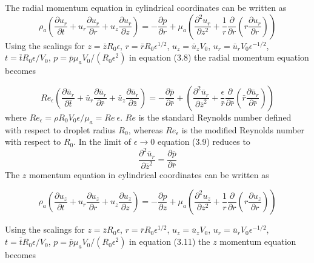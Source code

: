 \documentclass{jfm}
\begin{document}
The radial momentum equation in cylindrical coordinates can be written as
\begin{equation}
    {\rho}_a\left(\frac{{\partial}{u}_r}{{\partial}t}+{u}_r\frac{{\partial}{u}_r}{{\partial}r}+{u}_z\frac{{\partial}{u}_r}{{\partial}z}\right)=-\frac{{\partial}{p}}{{\partial}r} + {\mu}_a\left(\frac{{\partial}^2{u}_r}{{\partial}{z}^2} + \frac{1}{r}\frac{{\partial}}{{\partial}r}\left(r\frac{{\partial}{u}_r}{{\partial}r}\right)\right)
\end{equation}
Using the scalings for $z=\bar{z}R_0{\epsilon}$, ${r}=\bar{r}R_0{\epsilon}^{1/2}$, $u_z=\bar{u}_zV_0$,
$u_r=\bar{u}_rV_0{\epsilon}^{-1/2}$, $t=\bar{t}R_0{\epsilon}/V_0$, $p=\bar{p}{\mu}_aV_0/(R_0{\epsilon}^2)$ in equation (3.8) the radial momentum equation becomes

\begin{equation}
    Re_{\epsilon}\left(\frac{{\partial}\bar{u}_r}{{\partial}\bar{t}}+\bar{u}_r\frac{{\partial}\bar{u}_r}{{\partial}\bar{r}}+\bar{u}_z\frac{{\partial}\bar{u}_r}{{\partial}\bar{z}}\right)=-\frac{{\partial}\bar{p}}{{\partial}\bar{r}} + \left(\frac{{\partial}^2\bar{u}_r}{{\partial}\bar{z}^2} + \frac{\epsilon}{\bar{r}}\frac{{\partial}}{{\partial}\bar{r}}\left(\bar{r}\frac{{\partial}\bar{u}_r}{{\partial}\bar{r}}\right)\right)
\end{equation}
where $Re_{\epsilon}={\rho}R_0V_0{\epsilon}/{\mu}_a=Re{\:}{\epsilon}$. 
$Re$ is the standard Reynolds number defined with respect to droplet radius $R_0$, whereas $Re_{\epsilon}$ is the modified Reynolds number with respect to $R_0$. In the limit of ${\epsilon}{\rightarrow}0$ equation (3.9) reduces to
\begin{equation}
    \frac{{\partial}^2\bar{u}_r}{{\partial}\bar{z}^2}{=}\frac{{\partial}\bar{p}}{{\partial}\bar{r}}
\end{equation}
The $z$ momentum equation in cylindrical coordinates can be written as

\begin{equation}
    {\rho}_a\left(\frac{{\partial}{u}_z}{{\partial}t}+{u}_r\frac{{\partial}{u}_z}{{\partial}r}+{u}_z\frac{{\partial}{u}_z}{{\partial}z}\right)=-\frac{{\partial}{p}}{{\partial}z} + {\mu}_a\left(\frac{{\partial}^2{u}_z}{{\partial}{z}^2} + \frac{1}{r}\frac{{\partial}}{{\partial}r}\left(r\frac{{\partial}{u}_z}{{\partial}r}\right)\right)
\end{equation}

Using the scalings for $z=\bar{z}R_0{\epsilon}$, ${r}=\bar{r}R_0{\epsilon}^{1/2}$, $u_z=\bar{u}_zV_0$,
$u_r=\bar{u}_rV_0{\epsilon}^{-1/2}$, $t=\bar{t}R_0{\epsilon}/V_0$, $p=\bar{p}{\mu}_aV_0/(R_0{\epsilon}^2)$ in equation (3.11) the $z$ momentum equation becomes
\end{document}
